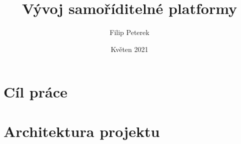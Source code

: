 \documentclass{beamer}
\title{Vývoj samoříditelné platformy}
\author{Filip Peterek}
\institute{Vysoká škola Báňská - Technická univerzita Ostrava}
\date{Květen 2021}
\begin{document}
\section{Cíl práce}

\section{Architektura projektu}
\end{document}
